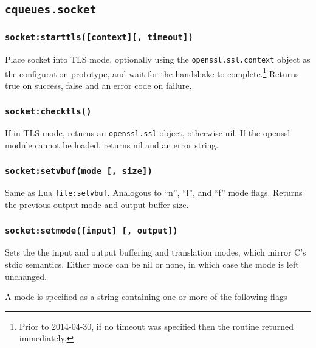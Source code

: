 \documentclass[11pt, oneside]{memoir}
\newcommand*{\fn}[1]{\texttt{#1}\xspace}
\newcommand*{\module}[1]{\texttt{#1}\xspace}
\newcounter{toccols}
\newenvironment{Module}[1]{
	\subsection{\texttt{#1}}
	\addtocontents{toc}{
		\protect\begin{multicols}{\value{toccols}}
	}
}{
	\addtocontents{toc}{\protect\end{multicols}}
}
\begin{document}
\begin{Module}{cqueues.socket}
\subsubsection[\fn{socket:starttls}]{\fn{socket:starttls([context][, timeout])}}
Place socket into TLS mode, optionally using the \module{openssl.ssl.context} object as the configuration prototype, and wait for the handshake to complete.\footnote{Prior to 2014-04-30, if no timeout was specified then the routine returned immediately.} Returns true on success, false and an error code on failure.

\subsubsection[\fn{socket:checktls}]{\fn{socket:checktls()}}

If in TLS mode, returns an \module{openssl.ssl} object, otherwise nil. If the openssl module cannot be loaded, returns nil and an error string.

\subsubsection[\fn{socket:setvbuf}]{\fn{socket:setvbuf(mode [, size])}}
Same as Lua \fn{file:setvbuf}. Analogous to ``n'', ``l'', and ``f'' mode flags. Returns the previous output mode and output buffer size.

\subsubsection[\fn{socket:setmode}]{\fn{socket:setmode([input] [, output])}}
Sets the the input and output buffering and translation modes, which mirror C's stdio semantics. Either mode can be nil or none, in which case the mode is left unchanged.

A mode is specified as a string containing one or more of the following flags


\end{Module}
\end{document}

